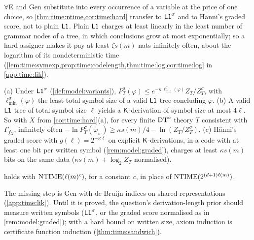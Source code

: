 $\forall$E and Gen substitute into every occurrence of a variable at the price of one choice, so \cref{thm:time:ntime,cor:time:hard} transfer to $\mathord{\mathsf{L1}}^{\sigma}$ and to H\"anni's graded score, not to plain $\mathord{\mathsf{L1}}$. Plain $\mathord{\mathsf{L1}}$ charges at least linearly in the least number of grammar nodes of a tree, in which conclusions grow at most exponentially; so a hard assigner makes it pay at least $\zeta s(m)$ nats infinitely often, about the logarithm of its nondeterministic time  (\cref{lem:time:symexp,prop:time:codelength,thm:time:log,cor:time:log} in \cref{app:time:lik}).

\begin{proposition}\label{prop:time:sigma}
(a) Under $\mathord{\mathsf{L1}}^{\sigma}$ (\cref{def:model:variants}), $P^\sigma_T(\varphi)\le e^{-\kappa\,\ell^\sigma_{\min}(\varphi)}Z_T/Z^\sigma_T$, with $\ell^\sigma_{\min}(\varphi)$ the least total symbol size of a valid $\mathord{\mathsf{L1}}$ tree concluding $\varphi$.
(b) A valid $\mathord{\mathsf{L1}}$ tree of total symbol size $\ell$ yields a $\mathsf{K}$-derivation of symbol size at most $4\ell$. So with $X$ from \cref{cor:time:hard}(a), for every finite $\mathrm{DT}^{\circ}$ theory $T$ consistent with $\Gamma_{f_X}$, infinitely often $-\ln P^\sigma_T(\varphi_w)\ge\kappa s(m)/4-\ln(Z_T/Z^\sigma_T)$.
(c) H\"anni's graded score with $g(\ell)=2^{-\kappa\ell}$ on explicit $\mathsf{K}$-derivations, in a code with at least one bit per written symbol (\cref{rem:model:graded}), charges at least $\kappa s(m)$ bits on the same data ($\kappa s(m)+\log_2Z_T$ normalised).
\end{proposition}

\begin{conjecture}\label{conj:time:poly}
 holds with $\mathrm{NTIME}(\ell(m)^c)$, for a constant $c$, in place of $\mathrm{NTIME}(2^{(d+1)\ell(m)})$.
\end{conjecture}

The missing step is Gen with de Bruijn indices on shared representations (\cref{app:time:lik}). Until it is proved, the question's derivation-length prior should measure written symbols ($\mathord{\mathsf{L1}}^{\sigma}$, or the graded score normalised as in \cref{rem:model:graded}); with a hard bound on written size, axiom induction is certificate function induction (\cref{thm:time:sandwich}).

